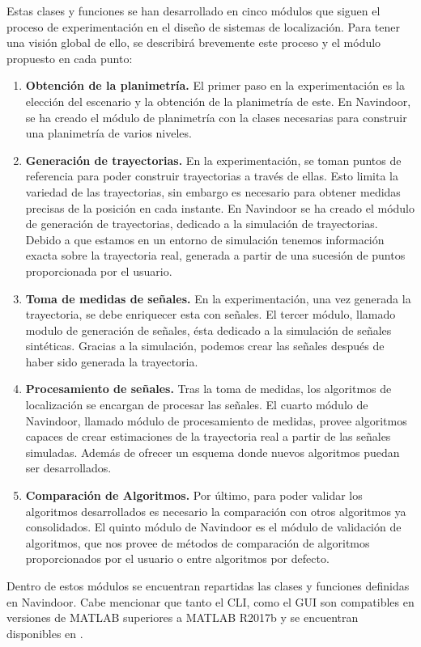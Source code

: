 Estas clases y funciones se han desarrollado en cinco módulos que siguen el proceso de experimentación en el diseño de sistemas de localización. Para tener una visión global de ello, se describirá brevemente este proceso y el módulo propuesto en cada punto:

\begin{enumerate}
    \item \textbf{Obtención de la planimetría.} El primer paso en la experimentación es la elección del escenario y la obtención de la planimetría de este. En Navindoor, se ha creado el módulo de planimetría con la clases necesarias para construir una planimetría de varios niveles. 
    \item \textbf{Generación de trayectorias.} En la experimentación, se toman puntos de referencia para poder construir trayectorias a través de ellas. Esto limita la variedad de las trayectorias, sin embargo es necesario para obtener medidas precisas de la posición en cada instante. 
    En Navindoor se ha creado el módulo de generación de trayectorias, dedicado a la simulación de trayectorias. Debido a que estamos en un entorno de simulación tenemos información exacta sobre la trayectoria real, generada a partir de una sucesión de puntos proporcionada por el usuario.
    \item \textbf{Toma de medidas de señales.} En la experimentación, una vez generada la trayectoria, se debe enriquecer esta con señales. El tercer módulo, llamado modulo de generación de señales, ésta dedicado a la simulación de señales sintéticas. Gracias a la simulación, podemos crear las señales después de haber sido generada la trayectoria. 
    \item \textbf{Procesamiento de señales.} Tras la toma de medidas, los algoritmos de localización se encargan de procesar las señales. El cuarto módulo de Navindoor, llamado módulo de procesamiento de medidas, provee algoritmos capaces de crear estimaciones de la trayectoria real a partir de las señales simuladas. Además de ofrecer un esquema donde nuevos algoritmos puedan ser desarrollados.
    \item \textbf{Comparación de Algoritmos.} Por último, para poder validar los algoritmos desarrollados es necesario la comparación con otros algoritmos ya consolidados. El quinto módulo de Navindoor es el módulo de validación de algoritmos, que nos provee de métodos de comparación de algoritmos proporcionados por el usuario o entre algoritmos por defecto.
\end{enumerate}
Dentro de estos módulos se encuentran repartidas las clases y funciones definidas en Navindoor. Cabe mencionar que tanto el CLI, como el GUI son compatibles en versiones de MATLAB superiores a MATLAB R2017b y se encuentran disponibles en .


